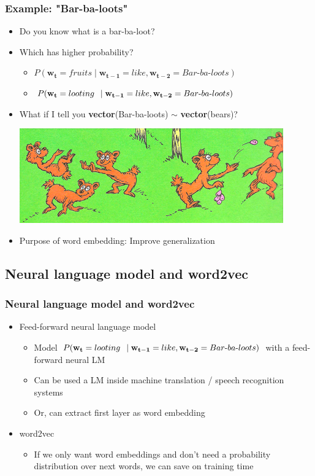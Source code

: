 \documentclass{beamer}
\newcommand{\bi}{\begin{itemize}}
\newcommand{\ei}{\end{itemize}}
\begin{document}
\begin{frame}
\frametitle{Example: "Bar-ba-loots"}
\bi
\item Do you know what is a bar-ba-loot?
\pause
\item Which has higher probability?
	\bi 
	\item $P(\mathbf{w_t}=fruits \mid \mathbf{w_{t-1}}=like, \mathbf{w_{t-2}}=Bar\mbox{-}ba\mbox{-}loots)$
	\item $P(\mathbf{w_t}=looting\hspace{0.16cm} \mid \mathbf{w_{t-1}}=like, \mathbf{w_{t-2}}=Bar\mbox{-}ba\mbox{-}loots)$
	\ei
\pause
\item What if I tell you \textbf{vector}(Bar-ba-loots) $\sim$ \textbf{vector}(bears)?
\centerline{\includegraphics[scale=0.5]{figs/bar_ba_loots}}
\pause
\item Purpose of word embedding: Improve generalization
\ei

\end{frame}

\subsection{Neural language model and word2vec}

\begin{frame}
\frametitle{Neural language model and word2vec}
\bi
\item Feed-forward neural language model 
	\bi
	\item Model $P(\mathbf{w_t}=looting\hspace{0.16cm} \mid \mathbf{w_{t-1}}=like, \mathbf{w_{t-2}}=Bar\mbox{-}ba\mbox{-}loots)$ with a feed-forward neural LM
	\item Can be used a LM inside machine translation / speech recognition systems
	\item Or, can extract first layer as word embedding
	\ei
\item word2vec
	\bi
	\item If we only want word embeddings and don't need a probability distribution over next words, we can save on training time
	\ei
\ei
\end{frame}
\end{document}
